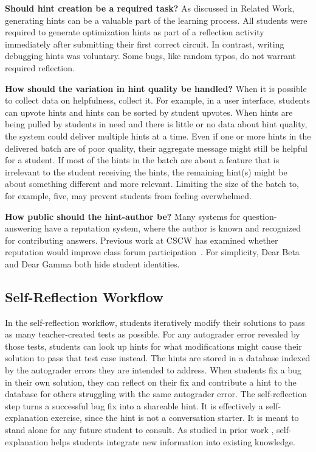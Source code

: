 {\bf Should hint creation be a required task?} As discussed in Related Work, generating hints can be a valuable part of the learning process. All students were required to generate optimization hints as part of a reflection activity immediately after submitting their first correct circuit. In contrast, writing debugging hints was voluntary. Some bugs, like random typos, do not warrant required reflection.

{\bf How should the variation in hint quality be handled?} 
When it is possible to collect data on helpfulness, collect it. For example, in a user interface, students can upvote hints and hints can be sorted by student upvotes. When hints are being pulled by students in need and there is little or no data about hint quality, the system could deliver multiple hints at a time. Even if one or more hints in the delivered batch are of poor quality, their aggregate message might still be helpful for a student. If most of the hints in the batch are about a feature that is irrelevant to the student receiving the hints, the remaining hint(s) might be about something different and more relevant. Limiting the size of the batch to, for example, five, may prevent students from feeling overwhelmed.

{\bf How public should the hint-author be?} Many systems for question-answering have a reputation system, where the author is known and recognized for contributing answers. Previous work at CSCW has examined whether reputation would improve class forum participation~\cite{reputation}. For simplicity, Dear Beta and Dear Gamma both hide student identities.

\subsection{Self-Reflection Workflow} 

In the self-reflection workflow, students iteratively modify their solutions to pass as many teacher-created tests as possible. For any autograder error revealed by those tests, students can look up hints for what modifications might cause their solution to pass that test case instead. The hints are stored in a database indexed by the autograder errors they are intended to address. When students fix a bug in their own solution, they can reflect on their fix and contribute a hint to the database for others struggling with the same autograder error. The self-reflection step turns a successful bug fix into a shareable hint. It is effectively a self-explanation exercise, since the hint is not a conversation starter. It is meant to stand alone for any future student to consult. As studied in prior work \cite{selfexplanation}, self-explanation helps students integrate new information into existing knowledge.

